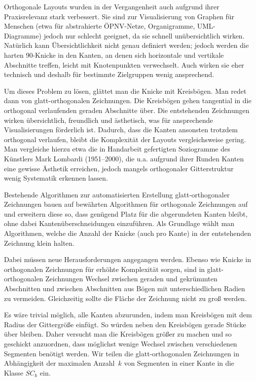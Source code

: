 \documentclass[a4paper]{scrreprt}
\theoremstyle{definition}
\begin{document}
Orthogonale Layouts wurden in der Vergangenheit auch aufgrund ihrer Praxisrelevanz stark verbessert. Sie sind zur Visualisierung von Graphen für Menschen (etwa für abstrahierte ÖPNV-Netze, Organigramme, UML-Diagramme) jedoch nur schlecht geeignet, da sie schnell unübersichtlich wirken. %
Natürlich kann Übersichtlichkeit nicht genau definiert werden; jedoch werden die harten 90\textdegree-Knicke in den Kanten, an denen sich horizontale und vertikale Abschnitte treffen, leicht mit Knotenpunkten verwechselt. Auch wirken sie eher technisch und deshalb für bestimmte Zielgruppen wenig ansprechend.

Um dieses Problem zu lösen, glättet man die Knicke mit Kreisbögen. Man redet dann von glatt-orthogonalen Zeichnungen. Die Kreisbögen gehen tangential in die orthogonal verlaufenden geraden Abschnitte über. Die entstehenden Zeichnungen wirken übersichtlich, freundlich und ästhetisch, was für ansprechende Visualisierungen förderlich ist. Dadurch, dass die Kanten ansonsten trotzdem orthogonal verlaufen, bleibt die Komplexität der Layouts vergleichsweise gering. Man vergleiche hierzu etwa die in Handarbeit gefertigten Soziogramme des Künstlers Mark Lombardi (1951--2000), die u.a. aufgrund ihrer Runden Kanten eine gewisse Ästhetik erreichen, jedoch mangels orthogonaler Gitterstruktur wenig Systematik erkennen lassen. 

Bestehende Algorithmen zur automatisierten Erstellung glatt-orthogonaler Zeichnungen bauen auf bewährten Algorithmen für orthogonale Zeichnungen auf und erweitern diese so, dass genügend Platz für die abgerundeten Kanten bleibt, ohne dabei Kantenüberschneidungen einzuführen. Als Grundlage wählt man Algorithmen, welche die Anzahl der Knicke (auch pro Kante) in der entstehenden Zeichnung klein halten. 

Dabei müssen neue Herausforderungen angegangen werden. Ebenso wie Knicke in orthogonalen Zeichnungen für erhöhte Komplexität sorgen, sind in glatt-orthogonalen Zeichnungen Wechsel zwischen geraden und gekrümmten Abschnitten und zwischen Abschnitten aus Bögen mit unterschiedlichen Radien zu vermeiden. Gleichzeitig sollte die Fläche der Zeichnung nicht zu groß werden.

Es wäre trivial möglich, alle Kanten abzurunden, indem man Kreisbögen mit dem Radius der Gittergröße einfügt. So würden neben den Kreisbögen gerade Stücke über bleiben. Daher versucht man die Kreisbögen größer zu machen und so geschickt anzuordnen, dass möglichst wenige Wechsel zwischen verschiedenen Segmenten benötigt werden. Wir teilen die glatt-orthogonalen Zeichnungen in Abhängigkeit der maximalen Anzahl~$k$ von Segmenten in einer Kante in die Klasse $SC_k$ ein. 
\end{document}

